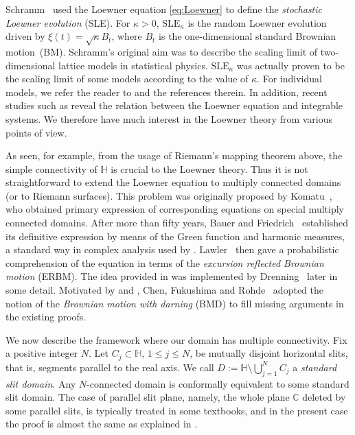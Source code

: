 \documentclass[preprint,12pt]{elsarticle}
\theoremstyle{definition}
\newcommand{\C}{\mathbb{C}}
\newcommand{\sle}{\mathrm{SLE}}
\newcommand{\uhp}{\mathbb{H}}
\begin{document}
Schramm~\cite{Sc00} used the Loewner equation \eqref{eq:Loewner}
to define the \emph{stochastic Loewner evolution} (SLE).
For $\kappa>0$, $\sle_{\kappa}$ is the random Loewner evolution
driven by $\xi(t)=\sqrt{\kappa}B_t$,
where $B_t$ is the one-dimensional standard Brownian motion~(BM).
Schramm's original aim was to describe
the scaling limit of two-dimensional lattice models in statistical physics.
$\sle_{\kappa}$ was actually proven to be the scaling limit of some models
according to the value of $\kappa$.
For individual models, we refer the reader to \cite[Section~2.5]{Ka15}
and the references therein.
In addition, recent studies such as \cite{Fr10} reveal
the relation between the Loewner equation and integrable systems.
We therefore have much interest in the Loewner theory
from various points of view.

As seen, for example, from the usage of Riemann's mapping theorem above,
the simple connectivity of $\uhp$ is crucial to the Loewner theory.
Thus it is not straightforward to extend the Loewner equation
to multiply connected domains (or to Riemann surfaces).
This problem was originally proposed by Komatu~\cite{Ko50},
who obtained primary expression of corresponding equations
on special multiply connected domains.
After more than fifty years, Bauer and Friedrich~\cite{BF08} established
its definitive expression by means of the Green function and harmonic measures,
a standard way in complex analysis used by \cite{Ko50}.
Lawler~\cite{La06} then gave a probabilistic comprehension of the equation
in terms of the \emph{excursion reflected Brownian motion} (ERBM).
The idea provided in \cite{La06} was implemented by Drenning~\cite{Dr11}
later in some detail.
Motivated by \cite{BF08} and \cite{La06},
Chen, Fukushima and Rohde~\cite{CFR16} adopted the notion of
the \emph{Brownian motion with darning} (BMD)
to fill missing arguments in the existing proofs.

We now describe the framework where our domain has multiple connectivity.
Fix a positive integer $N$.
Let $C_j \subset \uhp$, $1 \leq j \leq N$, be mutually disjoint horizontal slits,
that is, segments parallel to the real axis.
We call $D:=\uhp \setminus \bigcup_{j=1}^N C_j$ a \emph{standard slit domain}.
Any $N$-connected domain is conformally equivalent to some standard slit domain.
The case of parallel slit plane, namely,
the whole plane $\C$ deleted by some parallel slits,
is typically treated in some textbooks, and in the present case 
the proof is almost the same as explained in \cite[Section~2.2]{BF08}.
\end{document}
